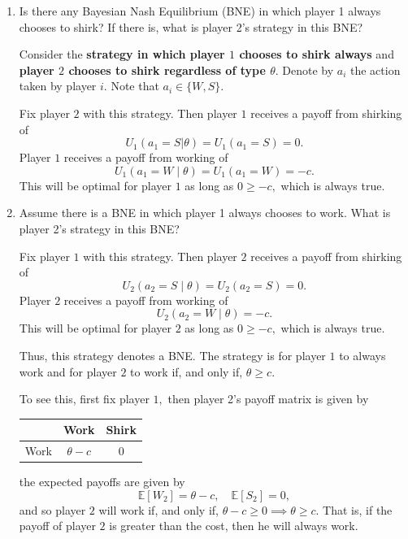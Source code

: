 \documentclass[11pt]{article}
\newcommand{\bbE}{\mathbb{E}}
\begin{document}
\begin{enumerate}
    \item Is there any Bayesian Nash Equilibrium (BNE) in which player 1 always chooses to shirk? If there is, what is player 2's strategy in this BNE?
\begin{solution}
    Consider the \textbf{strategy in which player $1$ chooses to shirk always} and \textbf{player $2$ chooses to shirk regardless of type $\theta.$} Denote by $a_i$ the action taken by player $i.$ Note that $a_i \in \{W,S\}.$

    Fix player $2$ with this strategy. Then player $1$ receives a payoff from shirking of 
    \[U_1(a_1 = S | \theta)= U_1(a_1 = S) = 0.\] Player $1$ receives a payoff from working of 
    \[U_1(a_1 = W\mid \theta)  = U_1(a_1 = W)= -c.\] This will be optimal for player $1$ as long as $\boxed{0\geq -c},$ which is always true. 

\end{solution}
    \item Assume there is a BNE in which player 1 always chooses to work. What is player 2's strategy in this BNE?
\begin{solution}
 Fix player $1$ with this strategy. Then player $2$ receives a payoff from shirking of 
    \[U_2(a_2 = S \mid \theta) = U_2(a_2 = S) = 0.\] Player $2$ receives a payoff from working of 
    \[U_2(a_2 = W \mid \theta) = -c.\] This will be optimal for player $2$ as long as $0\geq -c,$ which is always true. 

    Thus, this strategy denotes a BNE. 
The strategy is for player $1$ to always work and for player $2$ to work if, and only if, $\theta \geq c$.

To see this, first fix player $1,$ then player 2's payoff matrix is given by \begin{table}[H]
        \centering
        \begin{tabular}{c|c|c}
             & Work & Shirk \\
             \hline
             Work& $\theta-c$& 0 \\
        \end{tabular}
    \end{table} 
the expected payoffs are given by 
\[\bbE[W_2] = \theta -c, \quad \bbE[S_2] = 0,\] and so player $2$ will work if, and only if, $\theta - c \geq 0 \implies \boxed{\theta \geq c.}$ That is, if the payoff of player $2$ is greater than the cost, then he will always work. 
    

\end{solution}
\end{enumerate}
\end{document}
